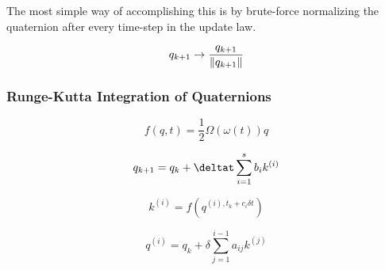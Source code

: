 The most simple way of accomplishing this is by brute-force normalizing the quaternion after every time-step in the update law. 

$$q _{k+1} \rightarrow \frac{q_{k+1}}{\lVert q_{k+1}\rVert}$$

\subsubsection{Runge-Kutta Integration of Quaternions}

$$f(q,t) = \frac{1}{2}\Omega(\omega(t))q$$

$$q_{k+1} = q_k + \deltat \sum_{i=1}^{s}b_{i}k^{(i)}$$ 

$$k^{(i)} = f(q^{(i), t_k + c_{i}\delta t})$$

$$q^{(i)} = q_k + \delta \sum_{j=1}^{i-1}a_{ij}k^{(j)}$$